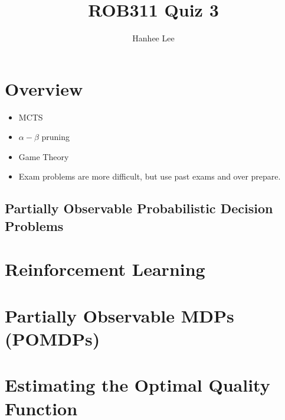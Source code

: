 \documentclass{article}
\title{ROB311 Quiz 3}
\author{Hanhee Lee}
\begin{document}
\maketitle

\tableofcontents
\newpage

\section{Overview}
\begin{summary}
    \begin{itemize}
        \item MCTS
        \item $\alpha-\beta$ pruning
        \item Game Theory
    \end{itemize}
    \vspace{1em}

    \begin{itemize}
        \item Exam problems are more difficult, but use past exams and over prepare. 
    \end{itemize}
\end{summary}

\begin{center}
    \section*{Partially Observable Probabilistic Decision Problems}
\end{center}

\section{Reinforcement Learning}

\newpage

\section{Partially Observable MDPs (POMDPs)}

\newpage

\section{Estimating the Optimal Quality Function}

\end{document}
